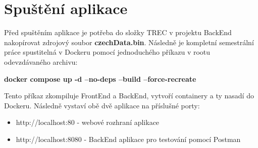 \documentclass[
12pt,
a4paper,
pdftex,
czech,
titlepage
]{report}
\begin{document}
\section{Spuštění aplikace}
Před spuštěním aplikace je potřeba do složky TREC v projektu BackEnd nakopírovat zdrojový soubor \textbf{czechData.bin}.
Následně je kompletní semestrální práce spustitelná v Dockeru pomocí jednoduchého příkazu v rootu odevzdávaného archivu:

\textbf{docker compose up -d --no-deps --build --force-recreate}

Tento příkaz zkompiluje FrontEnd a BackEnd, vytvoří containery a ty nasadí do Dockeru. Následně vystaví obě dvě aplikace na příslušné porty:
\begin{itemize}
    \item http://localhost:80 - webové rozhraní aplikace
    \item http://localhost:8080 - BackEnd aplikace pro testování pomocí Postman
\end{itemize}
\end{document}
